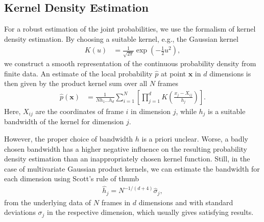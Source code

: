 \documentclass[12pt,a4paper,twoside,english,fleqn,preprint,aps,prb]{revtex4}
\newcommand{\xx}{\mathbf{x}}
\begin{document}
\subsection{Kernel Density Estimation}
For a robust estimation of the joint probabilities, we use the formalism of kernel density estimation.
By choosing a suitable kernel, e.g., the Gaussian kernel
\begin{align}
  K(u) &= \frac{1}{\sqrt{2\pi}} \exp(-\frac{1}{2} u^2),
\end{align}
we construct a smooth representation of the continuous probability density from finite data.
An estimate of the local probability $\hat{p}$ at point $\xx$ in $d$ dimensions is then given by the product kernel sum over all $N$ frames
\begin{align}
  \hat{p}(\xx) &= \frac{1}{N h_1 \dots h_d} \sum_{i=1}^{N}\left[ \prod_{j=1}^{d} K\left(\frac{x_j - X_{ij}}{h_j} \right)\right].
\end{align}
Here, $X_{ij}$ are the coordinates of frame $i$ in dimension $j$, while $h_j$ is a suitable bandwidth of the kernel for dimension $j$.

However, the proper choice of bandwidth $h$ is a priori unclear.
Worse, a badly chosen bandwidth has a higher negative influence on the resulting probability density estimation
than an inappropriately chosen kernel function.
Still, in the case of multivariate Gaussian product kernels, we can estimate the bandwidth for each dimension
using Scott's rule of thumb
\begin{align}
  \hat{h}_j = N^{-1/(d+4)} \hat{\sigma}_j,
\end{align}
from the underlying data of $N$ frames in $d$ dimensions and with standard deviations $\sigma_j$ in the respective dimension,
which usually gives satisfying results.
\end{document}

